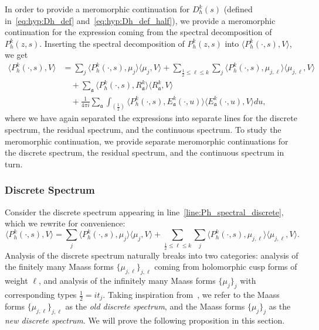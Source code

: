 In order to provide a meromorphic continuation for $D_h^k(s)$ (defined
in~\eqref{eq:hyp:Dh_def} and~\eqref{eq:hyp:Dh_def_half}), we provide a meromorphic
continuation for the expression coming from the spectral decomposition of $P_h^k(z,s)$.
Inserting the spectral decomposition of $P_h^k(z,s)$ into $\langle P_h^k(\cdot, s), V
\rangle$, we get
\begin{align}
  \langle P_h^k(\cdot, s), V \rangle &= \sum_j \langle P_h^k(\cdot, s), \mu_j \rangle
  \langle \mu_j, V \rangle + \sum_{\frac{1}{2} \leq \ell \leq k} \sum_j \langle
  P_h^k(\cdot, s), \mu_{j,\ell}\rangle \langle \mu_{j,\ell}, V \rangle
  \label{line:Ph_spectral_discrete} \\
  &\quad + \sum_{\mathfrak{a}} \langle P_h^k(\cdot, s), R^k_\mathfrak{a}\rangle \langle
  R^k_\mathfrak{a}, V \rangle \label{line:Ph_spectral_residual} \\
  &\quad + \frac{1}{4\pi i} \sum_{\mathfrak{a}} \int_{(\frac{1}{2})} \langle P_h^k(\cdot,
  s), E^k_{\mathfrak{a}}(\cdot, u) \rangle \langle E^k_{\mathfrak{a}}(\cdot, u), V \rangle
  du, \label{line:Ph_spectral_continuous}
\end{align}
where we have again separated the expressions into separate lines for the discrete
spectrum, the residual spectrum, and the continuous spectrum.
To study the meromorphic continuation, we provide separate meromorphic continuations for
the discrete spectrum, the residual spectrum, and the continuous spectrum in turn.



\subsubsection*{Discrete Spectrum}

Consider the discrete spectrum appearing in line~\eqref{line:Ph_spectral_discrete}, which
we rewrite for convenience:
\begin{equation}
  \langle P_h^k(\cdot, s), V \rangle = \sum_j \langle P_h^k(\cdot, s), \mu_j \rangle
  \langle \mu_j, V \rangle + \sum_{\frac{1}{2} \leq \ell \leq k} \sum_j \langle
  P_h^k(\cdot, s), \mu_{j,\ell}\rangle \langle \mu_{j,\ell}, V \rangle.
\end{equation}
Analysis of the discrete spectrum naturally breaks into two categories: analysis of the
finitely many Maass forms $\{\mu_{j, \ell}\}_{j, \ell}$ coming from holomorphic cusp
forms of weight $\ell$, and analysis of the infinitely many Maass forms $\{\mu_j\}_{j}$
with corresponding types $\tfrac{1}{2} = it_j$.
Taking inspiration from~\cite[\S3.10]{GoldfeldHundleyI}, we refer to the Maass
forms $\{\mu_{j, \ell}\}_{j, \ell}$ as the \emph{old discrete spectrum}, and
the Maass forms $\{\mu_j\}_j$ as the \emph{new discrete spectrum}.
We will prove the following proposition in this section.


